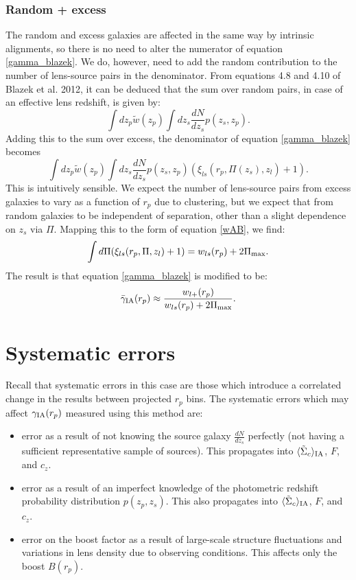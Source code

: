 \documentclass[onecolumn,amsmath,aps,fleqn, superscriptaddress]{revtex4}
\begin{document}
\subsubsection*{Random + excess}
The random and excess galaxies are affected in the same way by intrinsic alignments, so there is no need to alter the numerator of equation \ref{gamma_blazek}.
 We do, however, need to add the random contribution to the number of lens-source pairs in the denominator. From equations 4.8 and 4.10 of Blazek et al. 2012, it can be deduced that the sum over random pairs, in case of an effective lens redshift, is given by:
\begin{equation}
\int dz_p \tilde{w}(z_p) \int dz_s \frac{dN}{dz_s} p(z_s, z_p).
\end{equation}
Adding this to the sum over excess, the denominator of equation \ref{gamma_blazek} becomes
\begin{equation}
\int dz_p \tilde{w}(z_p) \int dz_s \frac{dN}{dz_s} p(z_s, z_p) \left(\xi_{ls}(r_p, \Pi(z_s), z_l) + 1\right).
\label{denom_rand}
\end{equation}
This is intuitively sensible. We expect the number of lens-source pairs from excess galaxies to vary as a function of $r_p$ due to clustering, but we expect that from random galaxies to be independent of separation, other than a slight dependence on $z_s$ via $\Pi$. Mapping this to the form of equation \ref{wAB}, we find:
\begin{equation}
\int d\Pi (\xi_{ls}(r_p, \Pi, z_l) + 1) = w_{ls}(r_p) + 2\Pi_{\rm max}.
\label{wl}
\end{equation}
The result is that equation \ref{gamma_blazek} is modified to be:
\begin{equation}
\bar{\gamma}_{\rm IA}(r_p) \approx \frac{w_{l+}(r_p)}{w_{ls}(r_p) + 2 \Pi_{\rm max}}.
\label{gamma_blazek_randoms}
\end{equation} 

\section{Systematic errors}
Recall that systematic errors in this case are those which introduce a correlated change in the results between projected $r_p$ bins. The systematic errors which may affect $\gamma_{\rm IA}(r_p)$ measured using this method are:
\begin{itemize}
\item{error as a result of not knowing the source galaxy $\frac{dN}{dz_s}$ perfectly (not having a sufficient representative sample of sources). This propagates into $\langle \tilde{\Sigma}_c\rangle_{\rm IA}$, $F$, and $c_z$.}
\item{error as a result of an imperfect knowledge of the photometric redshift probability distribution $p(z_p, z_s)$. This also propagates into $\langle \tilde{\Sigma}_c\rangle_{\rm IA}$, $F$, and $c_z$.}
\item{error on the boost factor as a result of large-scale structure fluctuations and variations in lens density due to observing conditions. This affects only the boost $B(r_p)$.}
\end{itemize}
\end{document}
